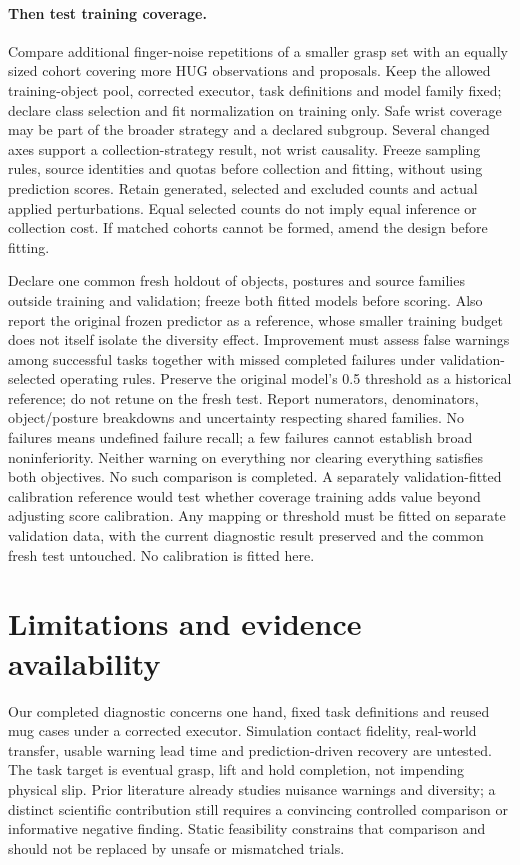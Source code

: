 \documentclass[10pt,letterpaper]{article}
\begin{document}
\paragraph{Then test training coverage.}
Compare additional finger-noise repetitions of a smaller grasp set with an
equally sized cohort covering more HUG observations and proposals. Keep the
allowed training-object pool, corrected executor, task definitions and model
family fixed; declare class selection and fit normalization on training only.
Safe wrist coverage may be part of the broader strategy and a declared subgroup.
Several changed axes support a collection-strategy result, not wrist causality.
Freeze sampling rules, source identities and quotas before collection and
fitting, without using prediction scores. Retain generated, selected and
excluded counts and actual applied
perturbations. Equal selected counts do not imply equal inference or collection
cost. If matched cohorts cannot be formed, amend the design before fitting.

Declare one common fresh holdout of objects, postures and source families
outside training and validation; freeze both fitted models before scoring.
Also report the original frozen predictor as a reference, whose smaller
training budget does not itself isolate the diversity effect. Improvement
must assess false warnings among successful tasks together with missed
completed failures under validation-selected operating rules. Preserve the
original model's 0.5 threshold as a historical reference; do not retune on the
fresh test. Report
numerators, denominators, object/posture breakdowns and uncertainty respecting
shared families. No failures means undefined failure recall; a few failures
cannot establish broad noninferiority. Neither warning on everything nor
clearing everything satisfies both objectives. No such comparison is completed.
A separately validation-fitted calibration reference would test whether coverage
training adds value beyond adjusting score calibration. Any mapping or threshold
must be fitted on separate validation data, with the current diagnostic result
preserved and the common fresh test untouched. No calibration is fitted here.

\section{Limitations and evidence availability}
Our completed diagnostic concerns one hand, fixed task definitions and reused
mug cases under a corrected executor. Simulation contact fidelity, real-world
transfer, usable warning lead time and prediction-driven recovery are untested.
The task target is eventual grasp, lift and hold completion, not impending
physical slip. Prior literature already studies nuisance warnings and diversity;
a distinct scientific contribution still requires a convincing controlled
comparison or informative negative finding. Static feasibility constrains that
comparison and should not be replaced by unsafe or mismatched trials.
\end{document}
